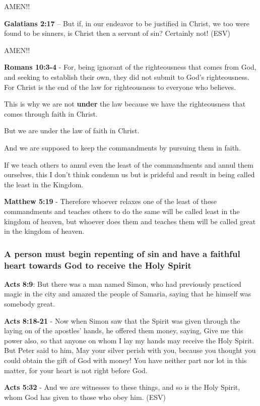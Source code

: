 \documentclass[11pt]{article}
\begin{document}
AMEN!!

\textbf{Galatians 2:17} -- But if, in our endeavor to be justified in Christ, we too were found to be sinners, is Christ then a servant of sin? Certainly not! (ESV)

AMEN!!

\textbf{Romans 10:3-4} - For, being ignorant of the righteousness that comes from God, and seeking to establish their own, they did not submit to God's righteousness. For Christ is the end of the law for righteousness to everyone who believes.

This is why we are not \textbf{under} the law because we have the righteousness that comes through faith in Christ.

But we are under the law of faith in Christ.

And we are supposed to keep the commandments by pursuing them in faith.

If we teach others to annul even the least of the commandments and annul them ourselves, this I don't think condemn us but is prideful and result in being called the least in the Kingdom.

\textbf{Matthew 5:19} - Therefore whoever relaxes one of the least of these commandments and teaches others to do the same will be called least in the kingdom of heaven, but whoever does them and teaches them will be called great in the kingdom of heaven.

\subsubsection{A person must begin repenting of sin and have a faithful heart towards God to receive the Holy Spirit}
\label{sec:org0429e46}
\textbf{Acts 8:9}: But there was a man named Simon, who had previously practiced magic in the city and amazed the people of Samaria, saying that he himself was somebody great.

\textbf{Acts 8:18-21} - Now when Simon saw that the Spirit was given through the laying on of the apostles' hands, he offered them money, saying, Give me this power also, so that anyone on whom I lay my hands may receive the Holy Spirit.  But Peter said to him, May your silver perish with you, because you thought you could obtain the gift of God with money!  You have neither part nor lot in this matter, for your heart is not right before God.

\textbf{Acts 5:32} - And we are witnesses to these things, and so is the Holy Spirit, whom God has given to those who obey him. (ESV)
\end{document}
